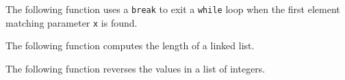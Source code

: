 \documentclass[a4paper,10pt,twcolumn]{article}
\begin{document}


The following function uses a \lstinline{break} to exit a \lstinline{while} loop when the first element matching parameter \lstinline{x} is found.  



The following function computes the length of a linked list.  



The following function reverses the values in a list of integers.


\end{document}
